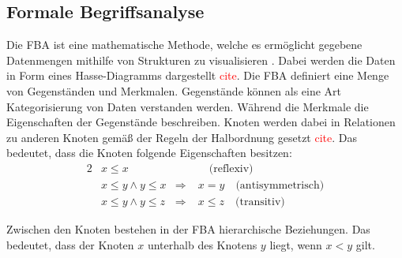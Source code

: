\subsection{Formale Begriffsanalyse}
Die \ac{FBA} ist eine mathematische Methode, welche es ermöglicht gegebene Datenmengen mithilfe von Strukturen zu visualisieren \cite{formale-begriffsanalyse}.
Dabei werden die Daten in Form eines Hasse-Diagramms dargestellt \textcolor{red}{cite}.
Die \ac{FBA} definiert eine Menge von Gegenständen und Merkmalen.
Gegenstände können als eine Art Kategorisierung von Daten verstanden werden.
Während die Merkmale die Eigenschaften der Gegenstände beschreiben.
Knoten werden dabei in Relationen zu anderen Knoten gemäß der Regeln der Halbordnung gesetzt \textcolor{red}{cite}.
Das bedeutet, dass die Knoten folgende Eigenschaften besitzen:
\begin{alignat*}{2}
     & x\leq x              &                & \quad\text{(reflexiv)}            \\ %
     & x\leq y\land y\leq x & \Rightarrow \; & x=y \quad\text{(antisymmetrisch)} \\
     & x\leq y\land y\leq z & \Rightarrow \; & x\leq z \quad\text{(transitiv)}
\end{alignat*}

Zwischen den Knoten bestehen in der \ac{FBA} hierarchische Beziehungen.
Das bedeutet, dass der Knoten $x$ unterhalb des Knotens $y$ liegt, wenn $x < y$ gilt. %

